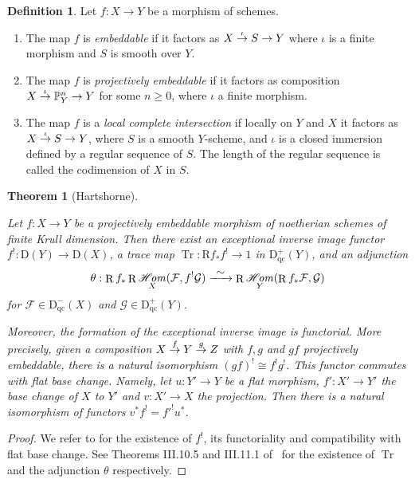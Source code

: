 \documentclass[JEP,XML,SOM,Unicode,published]{cedram}
\newcommand\To[1]{\mathchoice{\xrightarrow{\textstyle\kern4pt#1\kern3pt}}{\stackrel{#1}{\to}}{}{}}
\newcommand{\qc}{\mathrm{qc}}
\numberwithin{equation}{section}
\newtheorem{theo}[prop]{Theorem}
\theoremstyle{definition}
\newtheorem{definition}[prop]{Definition}
\newcommand{\bb}[1]{\mathbb{#1}}
\newcommand{\n}[1]{\mathcal{#1}}
\newcommand{\s}[1]{\mathscr{#1}}
\DeclareMathOperator{\Tr}{Tr}
\DeclareMathOperator{\R}{R}
\DeclareMathOperator{\sHom}{\s{H}\!\mathit{om}}
\begin{document}
\begin{definition}
Let $f:X\to Y$ be a morphism of schemes.
\begin{enumerate}
\item The map $f$ is \textit{embeddable} if it factors as $X\To{\iota} S \to Y $ where $\iota$ is a finite morphism and $S$ is smooth over $Y$.
\item The map $f$ is \textit{projectively embeddable} if it factors as composition \hbox{$ X\To{\iota} \bb{P}^n_Y\to Y$} for some $n\geq 0$, where $\iota$ a finite morphism.

\item The map $f$ is a \textit{local complete intersection} if locally on $Y$ and $X$ it factors as $X\To{\iota} S \to Y $, where $S$ is a smooth $Y$-scheme, and $\iota$ is a closed immersion defined by a regular sequence of $S$. The length of the regular sequence is called the codimension of $X$ in $S$.
\end{enumerate}
\end{definition}

\begin{theo}[Hartshorne]
\label{GrothSerreDuality}

Let $f: X\to Y$ be a projectively embeddable morphism of noetherian schemes of finite Krull dimension. Then there exist an exceptional inverse image functor $f^!: \mathrm{D}(Y)\to \mathrm{D}(X)$, a trace map $\Tr: \mathrm{R}f_*f^!\to 1$ in $\mathrm{D}^+_{\qc}(Y)$, and an adjunction
\[
\theta: \R f_* \R \sHom_{X}(\n{F}, f^! \n{G}) \To{\sim} \R\sHom_Y(\R f_* \n{F}, \n{G})
\]
for $\s{F}\in \mathrm{D}^-_{\qc}(X)$ and $\s{G}\in \mathrm{D}^+_{\qc}(Y)$.

Moreover, the formation of the exceptional inverse image is functorial. More precisely, given a composition $X\To{f} Y \To{g} Z$ with $f,g$ and $gf$ projectively embeddable, there is a natural isomorphism $(gf)^!\cong f^!g^!$. This functor commutes with flat base change. Namely, let $u:Y'\to Y$ be a flat morphism, $f':X'\to Y'$ the base change of $X$ to $Y'$ and $v: X'\to X$ the projection. Then there is a natural isomorphism of functors $v^*f^!={f'}^! u^*$.
\end{theo}

\begin{proof}
We refer to \cite[Th.\,III.8.7]{hartshorne1966residues} for the existence of $f^!$, its functoriality and compatibility with flat base change. See Theorems III.10.5 and III.11.1 of \loccit\ for the existence of $\Tr$ and the adjunction $\theta$ respectively.
\end{proof}
\end{document}
